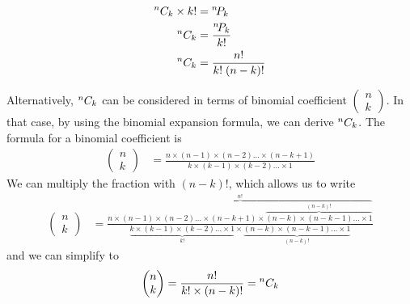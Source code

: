 \begin{align}
    {}^{n}C_{k}\times k! & = {}^{n}\!P_{k} \nonumber            \\
    {}^{n}C_{k}          & = \frac{{}^{n}\!P_{k}}{k!} \nonumber \\
    {}^{n}C_{k}          & = \frac{n!}{k!\;(n-k)!}
\end{align}

Alternatively, \mbox{${}^{n}C_{k}$} can be considered in terms of binomial coefficient \mbox{$\begin{pmatrix} n \\ k\end{pmatrix}$}. In that case, by using the binomial expansion formula, we can derive \mbox{${}^{n}C_{k}$}. The formula for a binomial coefficient is
\begin{align}
    \begin{pmatrix} n \\ k\end{pmatrix} & = \frac{n\times (n-1) \times (n-2) \dots \times (n-k+1)}{k\times (k-1) \times (k-2) \dots \times 1} \nonumber
\end{align}
We can multiply the fraction with \mbox{$(n-k)!$}, which allows us to write
\begin{align}
    \begin{pmatrix}
        n \\
        k
    \end{pmatrix}
     & = \frac{\overbrace{n\times (n-1) \times (n-2) \dots \times (n-k+1)\times \overbrace{(n-k) \times (n-k-1) \dots \times 1}^{(n-k)!}}^{n!}}{\underbrace{k\times (k-1) \times (k-2) \dots \times 1}_{k!}\times \underbrace{(n-k) \times (n-k-1) \dots \times 1}_{(n-k)!}} \nonumber
\end{align}
and we can simplify to
\begin{align}
    \begin{pmatrix} n \\ k\end{pmatrix} = \frac{n!}{k!\times (n-k)!} = {}^{n}C_{k}
\end{align}

